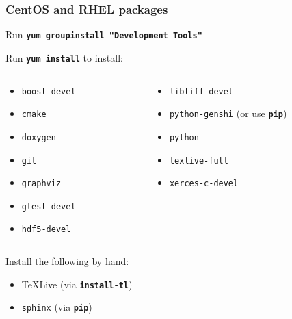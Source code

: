 \documentclass{beamer}
\newcommand{\cmd}[1]{\textbf{\texttt{#1}}}
\newcommand{\pkg}[1]{\texttt{#1}}
\begin{document}
\begin{frame}
  \frametitle{CentOS and RHEL packages}
  \scriptsize
  Run \cmd{yum groupinstall "Development Tools"}
  \bigskip

  Run \cmd{yum install} to install:
  \begin{columns}
    \begin{column}{.5\linewidth}
      \begin{itemize}
      \item[] \pkg{boost-devel}
      \item[] \pkg{cmake}
      \item[] \pkg{doxygen}
      \item[] \pkg{git}
      \item[] \pkg{graphviz}
      \item[] \pkg{gtest-devel}
      \item[] \pkg{hdf5-devel}
      \end{itemize}
    \end{column}
    \begin{column}{.5\linewidth}
      \begin{itemize}
      \item[] \pkg{libtiff-devel}
      \item[] \pkg{python-genshi} (or use \cmd{pip})
      \item[] \pkg{python}
      \item[] \pkg{texlive-full}
      \item[] \pkg{xerces-c-devel}
      \end{itemize}
    \end{column}
  \end{columns}

  \bigskip
  Install the following by hand:

  \begin{itemize}
  \item \TeX{}Live (via \cmd{install-tl})
  \item \pkg{sphinx} (via \cmd{pip})
\end{itemize}
\end{frame}
\end{document}
